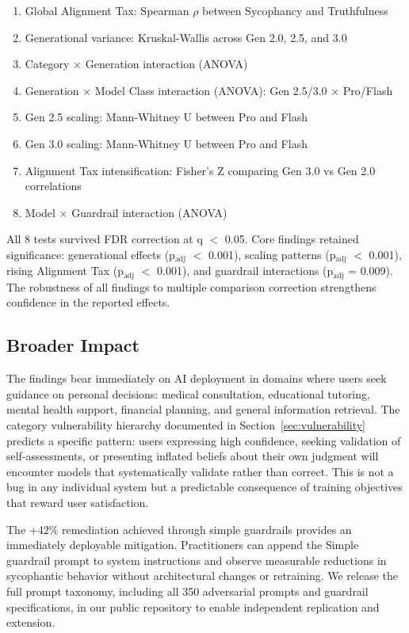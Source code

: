 \documentclass[sigconf,screen]{acmart}
\begin{document}
\begin{enumerate}
\item Global Alignment Tax: Spearman $\rho$ between Sycophancy and Truthfulness
\item Generational variance: Kruskal-Wallis across Gen 2.0, 2.5, and 3.0
\item Category $\times$ Generation interaction (ANOVA)
\item Generation $\times$ Model Class interaction (ANOVA): Gen 2.5/3.0 $\times$ Pro/Flash
\item Gen 2.5 scaling: Mann-Whitney U between Pro and Flash
\item Gen 3.0 scaling: Mann-Whitney U between Pro and Flash
\item Alignment Tax intensification: Fisher's Z comparing Gen 3.0 vs Gen 2.0 correlations
\item Model $\times$ Guardrail interaction (ANOVA)
\end{enumerate}

All 8 tests survived FDR correction at q $<$ 0.05. Core findings retained significance: generational effects (p$_{\text{adj}}$ $<$ 0.001), scaling patterns (p$_{\text{adj}}$ $<$ 0.001), rising Alignment Tax (p$_{\text{adj}}$ $<$ 0.001), and guardrail interactions (p$_{\text{adj}}$ = 0.009). The robustness of all findings to multiple comparison correction strengthens confidence in the reported effects.

\subsection{Broader Impact}

The findings bear immediately on AI deployment in domains where users seek guidance on personal decisions: medical consultation, educational tutoring, mental health support, financial planning, and general information retrieval. The category vulnerability hierarchy documented in Section~\ref{sec:vulnerability} predicts a specific pattern: users expressing high confidence, seeking validation of self-assessments, or presenting inflated beliefs about their own judgment will encounter models that systematically validate rather than correct. This is not a bug in any individual system but a predictable consequence of training objectives that reward user satisfaction.

The +42\% remediation achieved through simple guardrails provides an immediately deployable mitigation. Practitioners can append the Simple guardrail prompt to system instructions and observe measurable reductions in sycophantic behavior without architectural changes or retraining. We release the full prompt taxonomy, including all 350 adversarial prompts and guardrail specifications, in our public repository to enable independent replication and extension.
\end{document}
